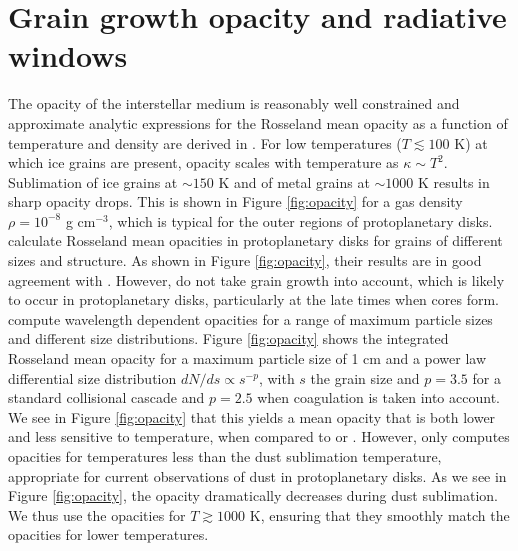 \section{Grain growth opacity and radiative windows} \label{radwindow}

The opacity of the interstellar medium is reasonably well constrained and approximate analytic expressions for the Rosseland mean opacity as a function of temperature and density are derived in \citet{bell94}. For low temperatures ($T \lesssim 100$ K) at which ice grains are present, opacity scales with temperature as $\kappa \sim T^2$. Sublimation of ice grains at $\sim$$150$ K and of metal grains at $\sim$$1000$ K results in sharp opacity drops. This is shown in Figure \ref{fig:opacity} for a gas density $\rho=10^{-8}$ g cm$^{-3}$, which is typical for the outer regions of protoplanetary disks. \citet{semenov03} calculate Rosseland mean opacities in protoplanetary disks for grains of different sizes and structure. As shown in Figure \ref{fig:opacity}, their results are in good agreement with \citet{bell94}. However, \citet{semenov03} do not take grain growth into account, which is likely to occur in protoplanetary disks, particularly at the late times when cores form. \citet{dalessio01} compute wavelength dependent opacities for a range of maximum particle sizes and different size distributions. Figure \ref{fig:opacity} shows the integrated Rosseland mean opacity for a maximum particle size of 1 cm and a power law differential size distribution $dN/ds \propto s^{-p}$, with $s$ the grain size and $p=3.5$ for a standard collisional cascade and $p=2.5$ when coagulation is taken into account. We see in Figure \ref{fig:opacity} that this yields a mean opacity that is both lower and less sensitive to temperature, when compared to \citet{bell94} or \citet{semenov03}. However, \citet{dalessio01} only computes opacities for temperatures less than the dust sublimation temperature, appropriate for current observations of dust in protoplanetary disks. As we see in Figure \ref{fig:opacity}, the opacity dramatically decreases during dust sublimation. We thus use the \citet{bell94} opacities for $T \gtrsim 1000$ K, ensuring that they smoothly match the \citet{dalessio01} opacities for lower temperatures.

